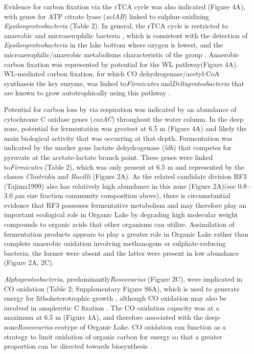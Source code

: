 {{Evidence for carbon fixation via the \ac{rTCA} cycle was also indicated (Figure 4A), with genes for ATP citrate lyase (\emph{aclAB}) linked to sulphur-oxidizing \emph{Epsilonproteobacteria} (Table 2). 
In general, the \ac{rTCA} cycle is restricted to anaerobic and microaerophilic bacteria \cite{Hugler2011}, which is consistent with the detection of \emph{Epsilonproteobacteria} in the lake bottom where oxygen is lowest, and the microaerophilic/anaerobic metabolisms characteristic of the group \cite{Campbell2006}. 
Anaerobic carbon fixation was represented by potential for the \ac{WL} pathway(Figure 4A). 
\ac{WL}-mediated carbon fixation, for which CO dehydrogenase/acetyl-CoA synthaseis the key enzyme, was linked to\emph{Firmicutes} and\emph{Deltaproteobacteria} that are known to grow autotrophically using this pathway \cite{Hugler2011}. 

Potential for carbon loss by via respiration was indicated by an abundance of cytochrome C oxidase genes (\emph{coxAC}) throughout the water column. 
In the deep zone, potential for fermentation was greatest at 6.5 m (Figure 4A) and likely the main biological activity that was occurring at that depth. 
Fermentation was indicated by the marker gene lactate dehydrogenase (\emph{ldh}) that competes for pyruvate at the acetate-lactate branch point. 
These genes were linked to\emph{Firmicutes} (Table 2), which was only present at 6.5 m and represented by the classes \emph{Clostridia} and \emph{Bacilli} (Figure 2A). 
As the related candidate division RF3 (Tajima1999) also has relatively high abundance in this zone (Figure 2A)(see 0.8–3.0 $\mu$m size fraction community composition above), there is circumstantial evidence that RF3 possesses fermentative metabolism and may therefore play an important ecological role in Organic Lake by degrading high molecular weight compounds to organic acids that other organisms can utilize. 
Assimilation of fermentation products appears to play a greater role in Organic Lake rather than complete anaerobic oxidation involving methanogens or sulphate-reducing bacteria; the former were absent and the latter were present in low abundance (Figure 2A, 2C). 

\emph{ \emph{Alphaproteobacteria}}, predominantly\emph{Roseovarius} (Figure 2C), were implicated in CO oxidation (Table 2; Supplementary Figure S6A), which is used to generate energy for lithoheterotrophic growth \cite{Moran2007}, although CO oxidation may also be involved in anaplerotic C fixation \cite{Moran2007}. 
The CO oxidation capacity was at a maximum at 6.5 m (Figure 4A), and therefore associated with the deep-zone\emph{Roseovarius} ecotype of Organic Lake. 
CO oxidation can function as a strategy to limit oxidation of organic carbon for energy so that a greater proportion can be directed towards biosynthesis \cite{Moran2007}.

}}
